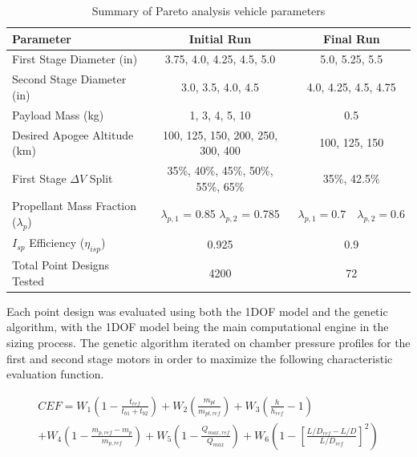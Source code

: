 \begin{table}
    \centering
    \begin{tabular}{|l|c|c|}
        \hline
        \textbf{Parameter} & \textbf{Initial Run} & \textbf{Final Run} \\ \hline
        First Stage Diameter (in) & 3.75, 4.0, 4.25, 4.5, 5.0 & 5.0, 5.25, 5.5 \\ \hline
        Second Stage Diameter (in) & 3.0, 3.5, 4.0, 4.5 & 4.0, 4.25, 4.5, 4.75 \\ \hline
        Payload Mass (kg) & 1, 3, 4, 5, 10 & 0.5 \\ \hline
        Desired Apogee Altitude (km) & 100, 125, 150, 200, 250, 300, 400 & 100, 125, 150 \\ \hline
        First Stage \(\Delta V\) Split & 35\%, 40\%, 45\%, 50\%, 55\%, 65\% & 35\%, 42.5\% \\ \hline
        Propellant Mass Fraction (\(\lambda_p\)) & \(\lambda_{p,1}\) = 0.85 \quad \(\lambda_{p,2}\) = 0.785 & \(\lambda_{p,1} = 0.7 \quad \lambda_{p,2} = 0.6\) \\ \hline
        \(I_{sp}\) Efficiency (\(\eta_{isp}\)) & 0.925 & 0.9 \\ \hline
        Total Point Designs Tested & 4200 & 72 \\ \hline
    \end{tabular}
    \caption{Summary of Pareto analysis vehicle parameters}
    \label{table:pareto-parameters}
\end{table}

Each point design was evaluated using both the 1DOF model and the genetic algorithm, with the 1DOF model being the main computational engine in the sizing process. The genetic algorithm iterated on chamber pressure profiles for the first and second stage motors in order to maximize the following characteristic evaluation function.

\begin{multline*}
    CEF = W_1 \left(1 - \frac{t_{ref}}{t_{b1} + t_{b2}}\right) + W_2 \left(\frac{m_{pl}}{m_{pl,ref}}\right) + W_3 \left(\frac{h}{h_{ref}} - 1\right) \\ 
    + W_4 \left(1 - \frac{m_{p,ref} - m_p}{m_{p,ref}}\right) + W_5 \left(1 - \frac{Q_{max,ref}}{Q_{max}}\right) + W_6 \left(1 - \left[\frac{L/D_{ref} - L/D}{L/D_{ref}}\right]^2\right)
\end{multline*}

